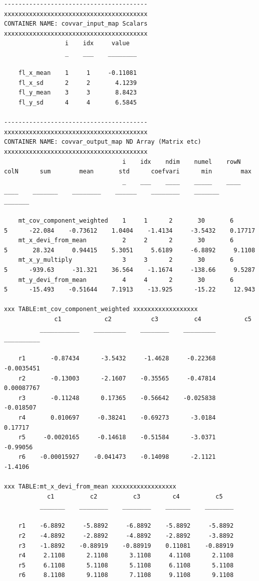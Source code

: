 \documentclass[
]{book}
\begin{document}
\begin{verbatim}
----------------------------------------
xxxxxxxxxxxxxxxxxxxxxxxxxxxxxxxxxxxxxxxx
CONTAINER NAME: covvar_input_map Scalars
xxxxxxxxxxxxxxxxxxxxxxxxxxxxxxxxxxxxxxxx
                 i    idx     value  
                 _    ___    ________

    fl_x_mean    1     1     -0.11081
    fl_x_sd      2     2       4.1239
    fl_y_mean    3     3       8.8423
    fl_y_sd      4     4       6.5845

----------------------------------------
xxxxxxxxxxxxxxxxxxxxxxxxxxxxxxxxxxxxxxxx
CONTAINER NAME: covvar_output_map ND Array (Matrix etc)
xxxxxxxxxxxxxxxxxxxxxxxxxxxxxxxxxxxxxxxx
                                 i    idx    ndim    numel    rowN    colN      sum        mean       std      coefvari      min        max  
                                 _    ___    ____    _____    ____    ____    _______    ________    ______    ________    _______    _______

    mt_cov_component_weighted    1     1      2       30       6       5      -22.084    -0.73612    1.0404    -1.4134     -3.5432    0.17717
    mt_x_devi_from_mean          2     2      2       30       6       5       28.324     0.94415    5.3051     5.6189     -6.8892     9.1108
    mt_x_y_multiply              3     3      2       30       6       5      -939.63     -31.321    36.564    -1.1674     -138.66     9.5287
    mt_y_devi_from_mean          4     4      2       30       6       5      -15.493    -0.51644    7.1913    -13.925      -15.22     12.943

xxx TABLE:mt_cov_component_weighted xxxxxxxxxxxxxxxxxx
              c1            c2           c3          c4            c5    
          ___________    _________    ________    _________    __________

    r1       -0.87434      -3.5432     -1.4628     -0.22368    -0.0035451
    r2       -0.13003      -2.1607    -0.35565     -0.47814    0.00087767
    r3       -0.11248      0.17365    -0.56642    -0.025838     -0.018507
    r4       0.010697     -0.38241    -0.69273      -3.0184       0.17717
    r5     -0.0020165     -0.14618    -0.51584      -3.0371      -0.99056
    r6    -0.00015927    -0.041473    -0.14098      -2.1121       -1.4106

xxx TABLE:mt_x_devi_from_mean xxxxxxxxxxxxxxxxxx
            c1          c2          c3         c4          c5   
          _______    ________    ________    _______    ________

    r1    -6.8892     -5.8892     -6.8892    -5.8892     -5.8892
    r2    -4.8892     -2.8892     -4.8892    -2.8892     -3.8892
    r3    -1.8892    -0.88919    -0.88919    0.11081    -0.88919
    r4     2.1108      2.1108      3.1108     4.1108      2.1108
    r5     6.1108      5.1108      5.1108     6.1108      5.1108
    r6     8.1108      9.1108      7.1108     9.1108      9.1108


\end{verbatim}
\end{document}
